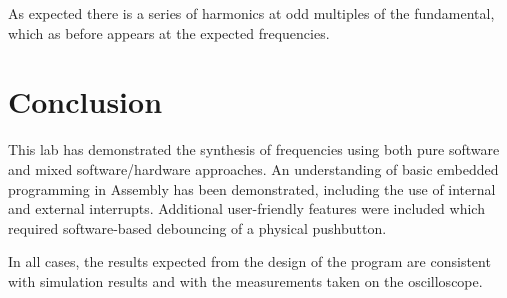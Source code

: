\documentclass[11pt]{article}
\begin{document}
As expected there is a series of harmonics at odd multiples of the fundamental, which as before appears at the expected frequencies.

\section{Conclusion}


This lab has demonstrated the synthesis of frequencies using both pure software and mixed software/hardware approaches. An understanding of basic embedded programming in Assembly has been demonstrated, including the use of internal and external interrupts. Additional user-friendly features were included which required software-based debouncing of a physical pushbutton.

In all cases, the results expected from the design of the program are consistent with simulation results and with the measurements taken on the oscilloscope.
\end{document}
